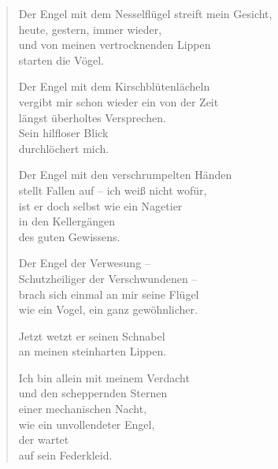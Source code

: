 
\cleartorecto


\begin{verse}
Der Engel mit dem Nesselflügel streift mein Gesicht,\\
heute, gestern, immer wieder,\\
und von meinen vertrocknenden Lippen\\
starten die Vögel.

Der Engel mit dem Kirschblütenlächeln\\
vergibt mir schon wieder ein von der Zeit\\
längst überholtes Versprechen.\\
Sein hilfloser Blick\\
durchlöchert mich.

Der Engel mit den verschrumpelten Händen\\
stellt Fallen auf -- ich weiß nicht wofür,\\
ist er doch selbst wie ein Nagetier\\
in den Kellergängen\\
des guten Gewissens.

Der Engel der Verwesung --\\
Schutzheiliger der Verschwundenen --\\
brach sich einmal an mir seine Flügel\\
wie ein Vogel, ein ganz gewöhnlicher.

Jetzt wetzt er seinen Schnabel\\
an meinen steinharten Lippen.

Ich bin allein mit meinem Verdacht\\
und den scheppernden Sternen\\
einer mechanischen Nacht,\\
wie ein unvollendeter Engel,\\
der wartet\\
auf sein Federkleid.
\end{verse}

\cleartoverso



